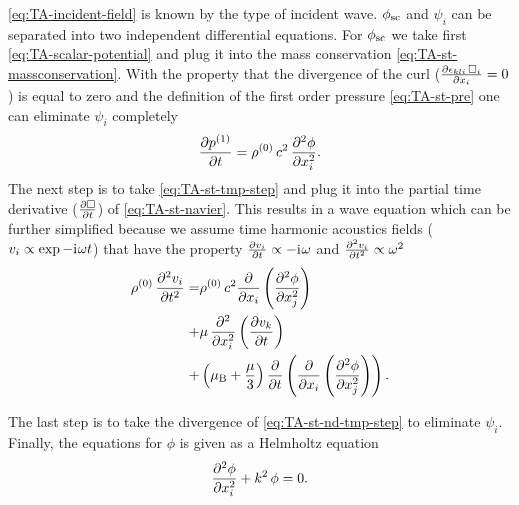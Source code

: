 \cref{eq:TA-incident-field} is known by the type of incident wave. 
$\phi_{\mathrm{sc}}$ and $\psi_{i}$ can be separated into two independent 
differential equations. For $\phi_{\mathrm{sc}}$ we take first 
\cref{eq:TA-scalar-potential} and plug it into the mass conservation 
\cref{eq:TA-st-massconservation}. With the property that the divergence of the 
curl ($\pdv{\epsilon_{kli}\,\Box_{i}}{x_{i}} = 0$) is equal to zero and the 
definition of the first order pressure \cref{eq:TA-st-pre} one can eliminate 
$\psi_{i}$ completely
\begin{equation}
  \pdv{  p^{(1)}  }{t} = \rho^{(0)}\,c^{2}\,\pdv[2]{\phi}{x_{i}}.
  \label{eq:TA-st-tmp-step}
\end{equation}
The next step is to take \cref{eq:TA-st-tmp-step} and plug it into the partial 
time derivative ($\pdv{\Box}{t}$) of \cref{eq:TA-st-navier}. This results in a 
wave equation which can be further simplified because we assume time harmonic 
acoustics fields ($v_{i}\propto\exp -\mathrm{i}\mkern1mu\omega t$) that have the property 
$\pdv{v_{i}}{t}\propto -\mathrm{i}\mkern1mu\omega$ and
$\pdv[2]{v_{i}}{t}\propto \omega^{2}$
\begin{equation}
  \label{eq:TA-st-nd-tmp-step}
\begin{split}
  \rho^{(0)}\,\pdv[2]{v_{i}}{t} = & 
  \rho^{(0)}\,c^{2}\pdv{x_{i}}\left( \pdv[2]{\phi}{x_{j}} \right) \\
  + & \mu\,\pdv[2]{x_{i}}\left( \pdv{v_{k}}{t} \right) \\
    + & \left(\mu_{\mathrm{B}} + \frac{\mu}{3}\right)\pdv{t}
    \left( \pdv{x_{i}}\left( \pdv[2]{\phi}{x_{j}} \right) \right).
\end{split}
\end{equation}

The last step is to take the divergence of \cref{eq:TA-st-nd-tmp-step} to 
eliminate $\psi_{i}$. Finally, the equations for $\phi$ is given as a Helmholtz 
equation
\begin{equation}
  \pdv[2]{\phi}{x_{i}} + k^{2}\,\phi = 0.
  \label{eq:TA-st-phi}
\end{equation}

